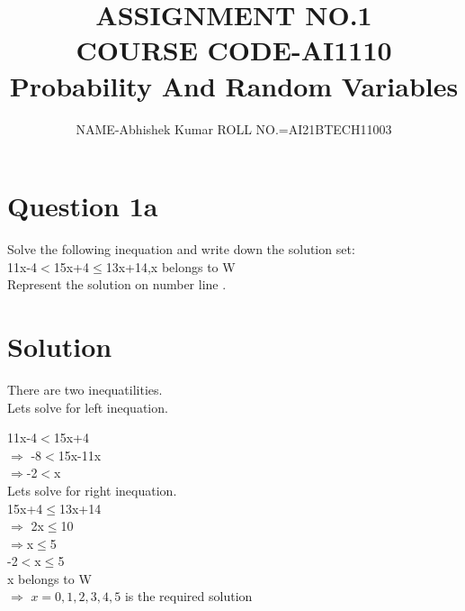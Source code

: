 \documentclass[12pt]{article}
\begin{document}
\title{ASSIGNMENT NO.1  \\COURSE CODE-AI1110\\ Probability And Random Variables }
\author{NAME-Abhishek Kumar ROLL NO.=AI21BTECH11003}
\maketitle

\section*{ Question 1a}
 Solve the following inequation and write down the solution set:\\
11x-4$<$15x+4$\le$13x+14,x belongs to W\\
Represent the solution on number line .

 \section*{Solution}

There are two inequatilities.\\

Lets solve for left inequation.

11x-4$<$15x+4\\
$\Rightarrow$ -8$<$15x-11x\\
$\Rightarrow$-2$<$x\\

 Lets solve for right inequation.\\
 15x+4$\le$13x+14\\
$\Rightarrow$ 2x$\le$10\\
$\Rightarrow$x$\le$5\\

-2$<$x$\le$5\\


x belongs to W\\
$\Rightarrow$ $x=0,1,2,3,4,5$ is the required solution
\end{document}
